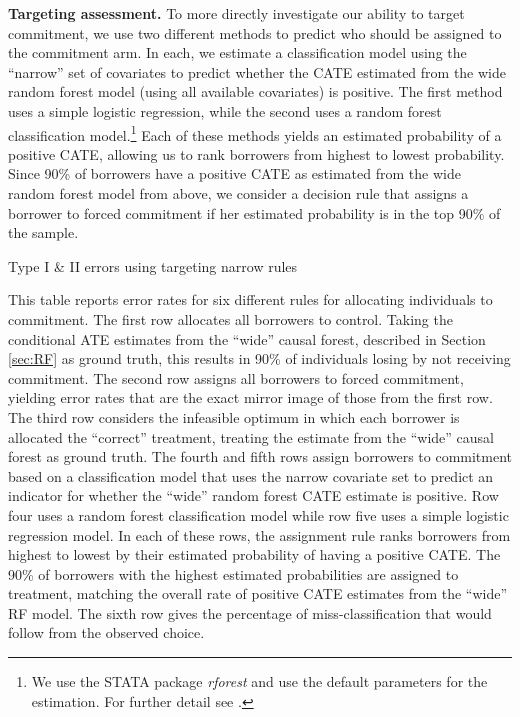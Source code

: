 \documentclass[11pt, a4paper]{article}
\begin{document}
\vspace{.2in}
\noindent \textbf{Targeting assessment.} To more directly investigate our ability to target commitment, we use two different methods to predict who should be assigned to the commitment arm. In each, we estimate a classification model using the ``narrow'' set of covariates to predict whether the CATE estimated from the wide random forest model (using all available covariates) is positive. The first method uses a simple logistic regression, while the second uses a random forest classification model.\footnote{We use the STATA package \textit{rforest} and use the default parameters for the estimation. For further detail see \cite{rforest_stata}.} Each of these methods yields an estimated probability of a positive CATE, allowing us to rank borrowers from highest to lowest probability. Since 90\% of borrowers have a positive CATE as estimated from the wide random forest model from above, we consider a decision rule that assigns a borrower to forced commitment if her estimated probability is in the top 90\% of the sample.


\begin{table}
\caption{Type I \& II errors using targeting narrow rules}
\label{hit_miss_rule}
\begin{center}

\scriptsize{}

\end{center}
\scriptsize{This table reports error rates for six different rules for allocating individuals to commitment. The first row allocates all borrowers to control. Taking the conditional ATE estimates from the ``wide'' causal forest, described in Section \ref{sec:RF} as ground truth, this results in 90\% of individuals losing by not receiving commitment. The second row assigns all borrowers to forced commitment, yielding error rates that are the exact mirror image of those from the first row.  The third row considers the infeasible optimum in which each borrower is allocated the ``correct'' treatment, treating the estimate from the ``wide'' causal forest as ground truth. The fourth and fifth rows assign borrowers to commitment based on a classification model that uses the narrow covariate set to predict an indicator for whether the ``wide'' random forest CATE estimate is positive. Row four uses a random forest classification model while row five uses a simple logistic regression model. In each of these rows, the assignment rule ranks borrowers from highest to lowest by their estimated probability of having a positive CATE. The 90\% of borrowers with the highest estimated probabilities are assigned to treatment, matching the overall rate of positive CATE estimates from the ``wide'' RF model. The sixth row gives the percentage of miss-classification that would follow from the observed choice. }
\end{table} 
\end{document}
